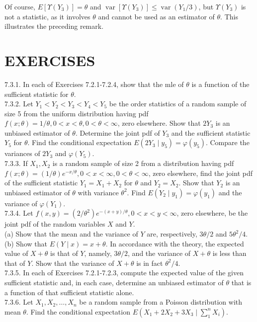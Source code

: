 Of course, $E\left[\Upsilon\left(Y_{3}\right)\right]=\theta$ and $\operatorname{var}\left[\Upsilon\left(Y_{3}\right)\right] \leq \operatorname{var}\left(Y_{1} / 3\right)$, but $\Upsilon\left(Y_{3}\right)$ is not a statistic, as it involves $\theta$ and cannot be used as an estimator of $\theta$. This illustrates the preceding remark.

\section*{EXERCISES}
7.3.1. In each of Exercises 7.2.1-7.2.4, show that the mle of $\theta$ is a function of the sufficient statistic for $\theta$.\\
7.3.2. Let $Y_{1}<Y_{2}<Y_{3}<Y_{4}<Y_{5}$ be the order statistics of a random sample of size 5 from the uniform distribution having pdf $f(x ; \theta)=1 / \theta, 0<x<\theta, 0<\theta<\infty$, zero elsewhere. Show that $2 Y_{3}$ is an unbiased estimator of $\theta$. Determine the joint pdf of $Y_{3}$ and the sufficient statistic $Y_{5}$ for $\theta$. Find the conditional expectation $E\left(2 Y_{3} \mid y_{5}\right)=\varphi\left(y_{5}\right)$. Compare the variances of $2 Y_{3}$ and $\varphi\left(Y_{5}\right)$.\\
7.3.3. If $X_{1}, X_{2}$ is a random sample of size 2 from a distribution having pdf $f(x ; \theta)=(1 / \theta) e^{-x / \theta}, 0<x<\infty, 0<\theta<\infty$, zero elsewhere, find the joint pdf of the sufficient statistic $Y_{1}=X_{1}+X_{2}$ for $\theta$ and $Y_{2}=X_{2}$. Show that $Y_{2}$ is an unbiased estimator of $\theta$ with variance $\theta^{2}$. Find $E\left(Y_{2} \mid y_{1}\right)=\varphi\left(y_{1}\right)$ and the variance of $\varphi\left(Y_{1}\right)$.\\
7.3.4. Let $f(x, y)=\left(2 / \theta^{2}\right) e^{-(x+y) / \theta}, 0<x<y<\infty$, zero elsewhere, be the joint pdf of the random variables $X$ and $Y$.\\
(a) Show that the mean and the variance of $Y$ are, respectively, $3 \theta / 2$ and $5 \theta^{2} / 4$.\\
(b) Show that $E(Y \mid x)=x+\theta$. In accordance with the theory, the expected value of $X+\theta$ is that of $Y$, namely, $3 \theta / 2$, and the variance of $X+\theta$ is less than that of $Y$. Show that the variance of $X+\theta$ is in fact $\theta^{2} / 4$.\\
7.3.5. In each of Exercises 7.2.1-7.2.3, compute the expected value of the given sufficient statistic and, in each case, determine an unbiased estimator of $\theta$ that is a function of that sufficient statistic alone.\\
7.3.6. Let $X_{1}, X_{2}, \ldots, X_{n}$ be a random sample from a Poisson distribution with mean $\theta$. Find the conditional expectation $E\left(X_{1}+2 X_{2}+3 X_{3} \mid \sum_{1}^{n} X_{i}\right)$.

